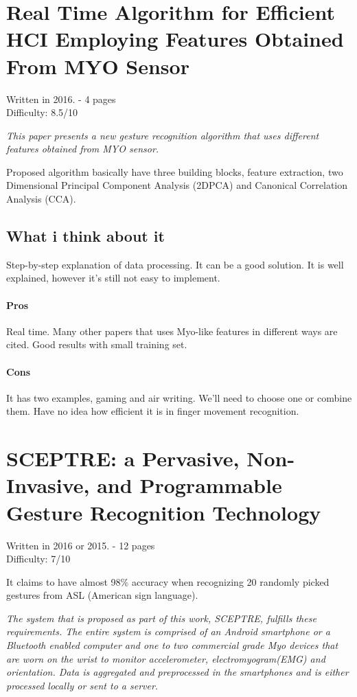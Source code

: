 \documentclass{article}
\begin{document}
\section{Real Time Algorithm for Efficient HCI Employing Features Obtained From MYO Sensor}
Written in 2016. - 4 pages\\
Difficulty: 8.5/10

\begin{center}
\textit{This paper presents a new gesture recognition algorithm that uses different features obtained from MYO sensor.}
\end{center}
Proposed algorithm basically have three building blocks, feature extraction, two Dimensional Principal Component Analysis (2DPCA) and Canonical Correlation Analysis (CCA).
\subsection{What i think about it}
Step-by-step explanation of data processing.
It can be a good solution. It is well explained, however it's still not easy to implement.
\paragraph{Pros}
Real time.
Many other papers that uses Myo-like features in different ways are cited.
Good results with small training set.
\paragraph{Cons}
It has two examples, gaming and air writing. We'll need to choose one or combine them.
Have no idea how efficient it is in finger movement recognition.

\section{SCEPTRE: a Pervasive, Non-Invasive, and Programmable Gesture Recognition Technology}
Written in 2016 or 2015. - 12 pages\\
Difficulty: 7/10

It claims to have almost 98\% accuracy when recognizing 20 randomly picked gestures from ASL (American sign language). 

\begin{center}
\textit{The system that is proposed as part of this work, SCEPTRE,
fulfills these requirements. The entire system is comprised of
an Android smartphone or a Bluetooth enabled computer and
one to two commercial grade Myo devices that are worn on
the wrist to monitor accelerometer, electromyogram(EMG)
and orientation. Data is aggregated and preprocessed in
the smartphones and is either processed locally or sent to a
server.}
\end{center}
\end{document}
